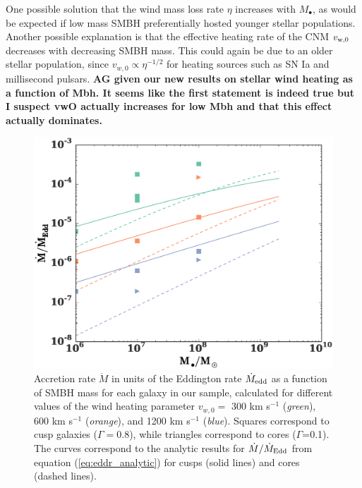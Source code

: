 \documentclass[usenatbib,fleqn]{mn2e}
\newcommand{\eddr}{\dot{M}/\dot{M}_{\rm Edd}}
\newcommand{\Mbh}[1][]{M_{\bullet#1}}
\newcommand{\vwO}{v_{w,0}}
\begin{document}
One possible solution that the wind mass loss rate $\eta$ increases
with $\Mbh$, as would be expected if low mass SMBH preferentially
hosted younger stellar populations.  Another possible explanation is
that the effective heating rate of the CNM $v_{\rm w,0}$ decreases
with decreasing SMBH mass.  This could again be due to an older
stellar population, since $v_{w,0} \propto \eta^{-1/2}$ for heating
sources such as SN Ia and millisecond pulsars.
{\bf AG given our new results on stellar wind heating as a function of
Mbh. It seems like the first statement is indeed true but I suspect
vwO actually increases for low Mbh and that this effect actually dominates.}

\begin{figure}
  \includegraphics[width=\columnwidth]{mdot_mass.eps}
  \caption{\label{fig:mdot_mass} Accretion rate $\dot{M}$ in units of
    the Eddington rate $\dot{M}_{\rm edd}$ as a function of SMBH mass
    for each galaxy in our sample, calculated for different values of
    the wind heating parameter $\vwO =$ 300 km s$^{-1}$ ({\it green}),
    600 km s$^{-1}$ ({\it orange}), and 1200 km s$^{-1}$ ({\it blue}).
    Squares correspond to cusp galaxies ($\Gamma=0.8$), while
    triangles correspond to cores ($\Gamma$=0.1). The curves correspond
    to the analytic results for $\eddr$ from equation
    (\ref{eq:eddr_analytic}) for cusps (solid lines) and cores (dashed
    lines).  }
\end{figure}
\end{document}
